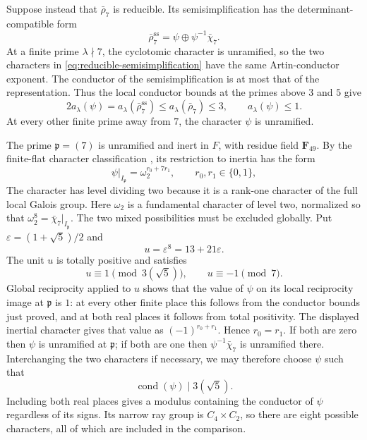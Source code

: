 \documentclass[11pt]{article}
\newcommand{\F}{\mathbf F}
\theoremstyle{definition}
\theoremstyle{remark}
\begin{document}
Suppose instead that $\bar\rho_7$ is reducible.  Its semisimplification has
the determinant-compatible form
\begin{equation}\label{eq:reducible-semisimplification}
 \bar\rho_7^{\mathrm{ss}}
       =\psi\oplus\psi^{-1}\bar\chi_7.
\end{equation}
At a finite prime $\lambda\nmid7$, the cyclotomic character is unramified,
so the two characters in \eqref{eq:reducible-semisimplification} have the
same Artin-conductor exponent.  The conductor of the semisimplification
is at most that of the representation.  Thus the local conductor bounds
at the primes above $3$ and $5$ give
\[
 2a_\lambda(\psi)
 =a_\lambda(\bar\rho_7^{\mathrm{ss}})
 \leq a_\lambda(\bar\rho_7)\leq3,
 \qquad a_\lambda(\psi)\leq1.
\]
At every other finite prime away from $7$, the character $\psi$ is
unramified.

The prime $\mathfrak p=(7)$ is unramified and inert in $F$, with residue
field $\F_{49}$.  By the finite-flat character classification
\cite[Corollary~3.4.4]{Raynaud1974}, its restriction to inertia has the form
\[
 \psi|_{I_{\mathfrak p}}=\omega_2^{r_0+7r_1},
 \qquad r_0,r_1\in\{0,1\},
\]
The character has level dividing two because it is a rank-one character
of the full local Galois group.  Here $\omega_2$ is a fundamental
character of level two, normalized so
that $\omega_2^{8}=\bar\chi_7|_{I_{\mathfrak p}}$.
The two mixed possibilities must be excluded globally.  Put
$\varepsilon=(1+\sqrt5)/2$ and
\[
 u=\varepsilon^8=13+21\varepsilon.
\]
The unit $u$ is totally positive and satisfies
\[
 u\equiv1\pmod{3(\sqrt5)},\qquad u\equiv-1\pmod{7}.
\]
Global reciprocity applied to $u$ shows that the value of $\psi$ on its
local reciprocity image at $\mathfrak p$ is $1$: at every other finite
place this follows from the conductor bounds just proved, and at both
real places it follows from total positivity.  The displayed inertial
character gives that value as $(-1)^{r_0+r_1}$.  Hence $r_0=r_1$.
If both are zero then $\psi$ is unramified at $\mathfrak p$; if both are
one then $\psi^{-1}\bar\chi_7$ is unramified there.  Interchanging the two
characters if necessary, we may therefore choose $\psi$ such that
\begin{equation}\label{eq:character-conductor}
 \operatorname{cond}(\psi)\mid3(\sqrt5).
\end{equation}
Including both real places gives a modulus containing the conductor of
$\psi$ regardless of its signs.  Its narrow ray group is
$C_4\times C_2$, so there are eight possible characters, all of which are
included in the comparison.
\end{document}
